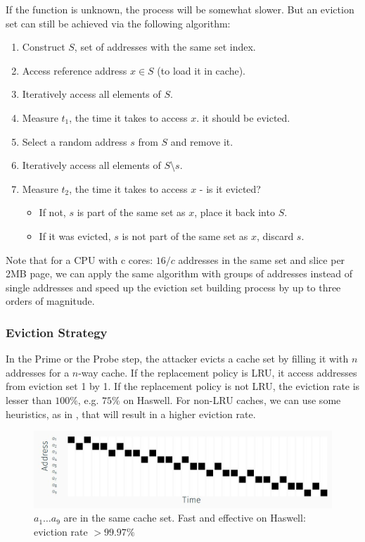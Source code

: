 If the function is unknown, the process will be somewhat slower. But an eviction
set can still be achieved via the following algorithm:
\begin{enumerate}
    \item Construct $S$, set of addresses with the same set index.
    \item Access reference address $x \in S$ (to load it in cache).
    \item Iteratively access all elements of $S$.
    \item Measure $t_1$, the time it takes to access $x$. it should be evicted.
    \item Select a random address $s$ from $S$ and remove it.
    \item Iteratively access all elements of $S$\textbackslash$s$.
    \item Measure $t_2$, the time it takes to access $x$ - is it evicted?
    \begin{itemize}
        \item If not, $s$ is part of the same set as $x$, place it back into
        $S$.
        \item If it was evicted, $s$ is not part of the same set as $x$, discard
        $s$.
    \end{itemize}
\end{enumerate}
\noindent Note that for a CPU with c cores: $16/c$ addresses in the same set and
slice per 2MB page, we can apply the same algorithm with groups of addresses
instead of single addresses and speed up the eviction set building process by up
to three orders of magnitude.

\subsubsection{Eviction Strategy}
\label{subsubsec:EvictionStrategy}
In the Prime or the Probe step, the attacker evicts a cache set by filling it
with $n$ addresses for a $n$-way cache. If the replacement policy is LRU, it
access addresses from eviction set 1 by 1. If the replacement policy is not LRU,
the eviction rate is lesser than $100\%$, e.g. $75\%$ on Haswell. For non-LRU
caches, we can use some heuristics, as in , that will
result in a higher eviction rate.

\begin{figure}[!ht]
    \centering
    \includegraphics[width=\textwidth]{images/chapter_6/haswellstrategy.JPG}
    \caption{$a_1\dots a_9$ are in the same cache set. Fast and effective on Haswell: eviction rate $> 99.97\%$}
    \label{fig:haswellstrategy}
\end{figure}

